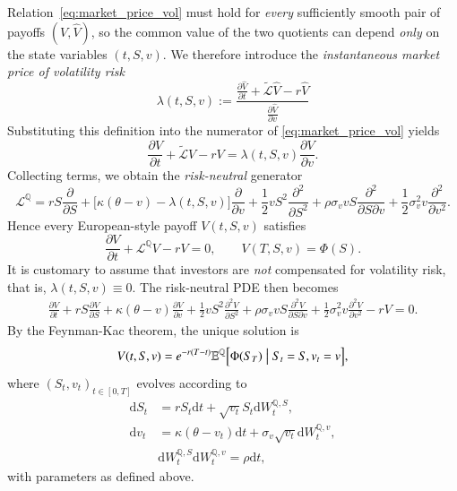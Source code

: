 \documentclass[12pt]{report} %
\theoremstyle{plain}           %
\theoremstyle{definition}      %
\theoremstyle{remark}          %
\begin{document}
Relation~\eqref{eq:market_price_vol} must hold for \emph{every} sufficiently smooth pair of
payoffs $(V,\widehat V)$, so the common value of the two quotients can depend \emph{only} on the
state variables $(t,S,v)$.  We therefore introduce the \emph{instantaneous market price of
volatility risk}
\[
    \lambda(t,S,v)
    := \frac{\frac{\partial \widehat V}{\partial t} + \tilde{\mathcal L} \widehat V - r \widehat V}{\frac{\partial \widehat V}{\partial  v}}
\]
Substituting this definition into the numerator of \eqref{eq:market_price_vol} yields
\[
    \frac{\partial V}{\partial t}+\tilde{\mathcal L}V-rV
    =
    \lambda(t,S,v)\frac{\partial V}{\partial v}.
\]
Collecting terms, we obtain the \emph{risk-neutral} generator
\[
    \mathcal L^{\mathbb Q}
    =
    rS\frac{\partial}{\partial S}
    +\bigl[\kappa(\theta-v)-\lambda(t,S,v)\bigr]\frac{\partial}{\partial v}
    +\frac12 vS^{2}\frac{\partial^{2}}{\partial S^{2}}
    +\rho\sigma_v vS\frac{\partial^{2}}{\partial S\partial v}
    +\frac12\sigma_v^{2}v\frac{\partial^{2}}{\partial v^{2}} .
\]
Hence every European-style payoff $V(t,S,v)$ satisfies
\begin{equation}\label{eq:heston_pde_lambda}
    \frac{\partial V}{\partial t}
    +\mathcal L^{\mathbb Q} V
    -rV
    =0,
    \qquad
    V(T,S,v)=\Phi(S).
\end{equation}
It is customary to assume that investors are \emph{not} compensated for volatility risk,
that is, $\lambda(t,S,v)\equiv0$. The risk-neutral PDE then becomes
\begin{equation}
\label{eq:heston_pde}
\begin{aligned}
	\frac{\partial V}{\partial t}+
	rS\frac{\partial V}{\partial S}
      +\kappa(\theta-v)\frac{\partial V}{\partial v}
      +\frac12 vS^{2}\frac{\partial^2V}{\partial S^{2}}
      +\rho\sigma_v vS\frac{\partial^2 V}{\partial S\partial v}
      +\frac12\sigma_v^{2}v\frac{\partial^2 V}{\partial v^{2}}
	  -rV
	  = 0.
\end{aligned}
\end{equation}
By the Feynman-Kac theorem, the unique solution is
\begin{equation}\label{eq:heston_fk}
V(t,S,v)=e^{-r(T-t)}\mathbb E^{\mathbb Q}\Bigl[\Phi(S_T)\bigm|S_t=S,v_t=v\Bigr],
\end{equation}
where $(S_t,v_t)_{t\in[0,T]}$ evolves according to
\begin{equation}\label{eq:heston_sde}
\begin{aligned}
  \mathrm{d}S_t &= rS_t\mathrm{d}t + \sqrt{v_t}S_t\mathrm{d}W_t^{\mathbb Q	,S},\\
  \mathrm{d}v_t &= \kappa(\theta-v_t)\mathrm{
d}t + \sigma_v\sqrt{v_t}\mathrm{d}W_t^{\mathbb Q,v},\\
  &\mathrm{d}W_t^{\mathbb Q,S}\mathrm{d}W_t^{\mathbb Q,v} = \rho\mathrm{d}t,
\end{aligned}
\end{equation}
with parameters as defined above.
\end{document}
